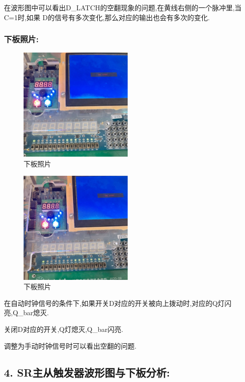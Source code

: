 \documentclass{article}
\begin{document}
在波形图中可以看出D\_LATCH的空翻现象的问题,在黄线右侧的一个脉冲里,当C=1时,如果
D的信号有多次变化,那么对应的输出也会有多次的变化.


\subsubsection*{下板照片:}

    \begin{figure}[H]
    \centering
    \includegraphics[width=0.5\textwidth]{lab9p/24.jpg}
    \caption{\label{Lab9}下板照片}
    \end{figure}

    \begin{figure}[H]
    \centering
    \includegraphics[width=0.5\textwidth]{lab9p/23.jpg}
    \caption{\label{Lab9}下板照片}
    \end{figure}

在自动时钟信号的条件下,如果开关D对应的开关被向上拨动时,对应的Q灯闪亮,Q\_bar熄灭.

关闭D对应的开关,Q灯熄灭,Q\_bar闪亮.

调整为手动时钟信号时可以看出空翻的问题.


\subsection*{4. SR主从触发器波形图与下板分析:}
\end{document}
